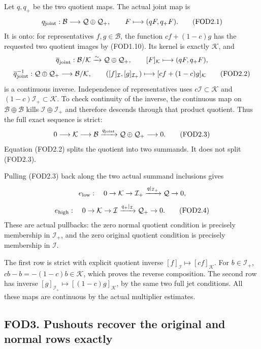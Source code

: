 Let \(q,q_+\) be the two quotient maps. The actual joint map is \[
q_{\rm joint}:\mathcal B\longrightarrow\mathcal Q\oplus\mathcal Q_+,
\qquad F\longmapsto(qF,q_+F).
\tag{FOD2.1}
\] It is onto: for representatives \(f,g\in\mathcal B\), the function
\(cf+(1-c)g\) has the requested two quotient images by (FOD1.10). Its
kernel is exactly \(\mathcal K\), and \[
\overline q_{\rm joint}:\mathcal B/\mathcal K\xrightarrow{\sim}\mathcal Q\oplus\mathcal Q_+,\qquad
[F]_{\mathcal K}\longmapsto(qF,q_+F),
\] \[
\overline q_{\rm joint}^{-1}:\mathcal Q\oplus\mathcal Q_+\longrightarrow\mathcal B/\mathcal K,\qquad
([f]_{\mathcal I},[g]_{\mathcal I_+})\longmapsto[cf+(1-c)g]_{\mathcal K}
\tag{FOD2.2}
\] is a continuous inverse. Independence of representatives uses
\(c\mathcal I\subset\mathcal K\) and
\((1-c)\mathcal I_+\subset\mathcal K\). To check continuity of the
inverse, the continuous map on \(\mathcal B\oplus\mathcal B\) kills
\(\mathcal I\oplus\mathcal I_+\) and therefore descends through that
product quotient. Thus the full exact sequence is strict: \[
0\longrightarrow\mathcal K\longrightarrow\mathcal B
\xrightarrow{q_{\rm joint}}\mathcal Q\oplus\mathcal Q_+
\longrightarrow0.
\tag{FOD2.3}
\] Equation (FOD2.2) splits the quotient into two summands. It does not
split (FOD2.3).

Pulling (FOD2.3) back along the two actual summand inclusions gives \[
e_{\rm low}:\quad0\to\mathcal K\to\mathcal I_+
\xrightarrow{q|_{\mathcal I_+}}\mathcal Q\to0,
\] \[
e_{\rm high}:\quad0\to\mathcal K\to\mathcal I
\xrightarrow{q_+|_{\mathcal I}}\mathcal Q_+\to0.
\tag{FOD2.4}
\] These are actual pullbacks: the zero normal quotient condition is
precisely membership in \(\mathcal I_+\), and the zero original quotient
condition is precisely membership in \(\mathcal I\).

The first row is strict with explicit quotient inverse
\([f]_{\mathcal I}\mapsto[cf]_{\mathcal K}\). For \(b\in\mathcal I_+\),
\(cb-b=-(1-c)b\in\mathcal K\), which proves the reverse composition. The
second row has inverse
\([g]_{\mathcal I_+}\mapsto[(1-c)g]_{\mathcal K}\), by the same two full
jet conditions. All these maps are continuous by the actual multiplier
estimates.

\subsection{FOD3. Pushouts recover the original and normal rows
exactly}\label{fod3.-pushouts-recover-the-original-and-normal-rows-exactly}

